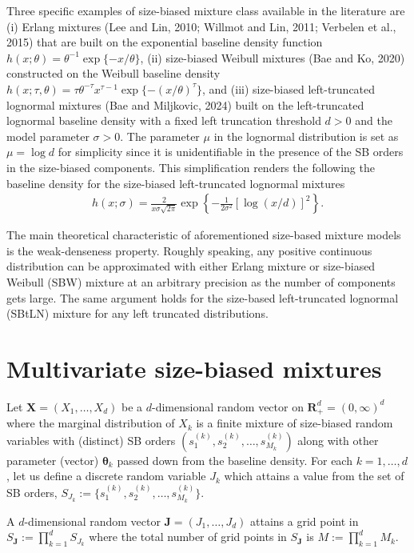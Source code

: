 \documentclass[11pt]{article}
\def\bea{\begin{eqnarray*}} \def\eea{\end{eqnarray*}}
\begin{document}
Three specific examples of size-biased mixture class available in the literature are (i) Erlang mixtures (Lee and Lin, 2010\nocite{leelin2010}; Willmot and Lin, 2011\nocite{willmot2011risk}; Verbelen et al., 2015\nocite{reynkens2017modelling}) that are built on the exponential baseline density function $h(x;\theta) = \theta^{-1}\exp\{-x/\theta\}$, (ii) size-biased Weibull mixtures (Bae and Ko, 2020) constructed on the Weibull baseline density $h(x;\tau,\theta) = \tau \theta^{-\tau} x^{\tau-1}\exp\{-(x/\theta)^{\tau}\}$, and  (iii) size-biased left-truncated lognormal mixtures (Bae and Miljkovic, 2024\nocite{bae2024loss}) built on the left-truncated lognormal baseline density with a fixed left truncation threshold $d >0$ and the model parameter $\sigma >0$. The parameter $\mu$ in the lognormal distribution is set as $\mu = \log d$ for simplicity since it is unidentifiable in the presence of the SB orders in the size-biased components.  This simplification renders the following the baseline density for the size-biased left-truncated lognormal mixtures 
\bea
h(x;\sigma) = \frac{2}{x\sigma\sqrt{2\pi}}\exp\left\{-\frac{1}{2\sigma^2}\left[\log(x/d)\right]^2\right\}.
\eea

The main theoretical characteristic of aforementioned size-based mixture models is the weak-denseness property. Roughly speaking, any positive continuous distribution can be approximated with either Erlang mixture or size-biased Weibull (SBW) mixture at an arbitrary precision as the number of components gets large. The same argument holds for the size-based left-truncated lognormal (SBtLN) mixture for any left truncated distributions. 

\section{Multivariate size-biased mixtures}\label{sec3}

Let $\bm{X} = (X_1,\ldots, X_d)$ be a $d$-dimensional random vector on $\bm{R}_+^d = (0,\infty)^d$ where the marginal distribution of $X_k$ is a finite mixture of size-biased random variables with (distinct) SB orders $(s_1^{(k)}, s_2^{(k)}, \ldots, s_{M_k}^{(k)})$ along with other parameter (vector) $\bm{\theta}_k$ passed down from the baseline density. For each $k = 1,\ldots, d$, let us define a discrete random variable $J_k$ which attains a value from the set of SB orders, $S_{J_k} := \{s_1^{(k)}, s_2^{(k)}, \ldots, s_{M_k}^{(k)}\}$.  

A $d$-dimensional random vector $\bm{J} = (J_1,\ldots, J_d)$ attains a grid point in $S_{\bm{J}} := \prod_{k=1}^d  S_{J_k}$ where the total number of grid points in $S_{\bm{J}}$ is $M := \prod_{k=1}^d M_k$.
\end{document}
